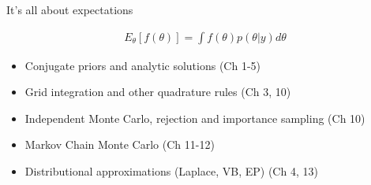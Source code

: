\documentclass[finnish,english,t]{beamer}
\begin{document}
 \begin{frame}
   
  {\Large\color{navyblue} It's all about expectations}

   \begin{align*}
   E_{\theta}[f(\theta)] = \int f(\theta) p(\theta|y) d\theta
   \end{align*}

  \begin{itemize}
  \item Conjugate priors and analytic solutions (Ch 1-5)
  \item Grid integration and other quadrature rules (Ch 3, 10)
  \item Independent Monte Carlo, rejection and importance sampling (Ch 10)
  \item Markov Chain Monte Carlo (Ch 11-12)
  \item Distributional approximations (Laplace, VB, EP) (Ch 4, 13)
  \end{itemize}
   

 \end{frame}
\end{document}
